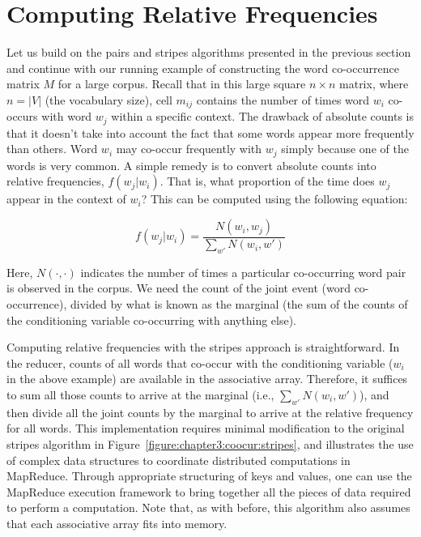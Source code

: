 \section{Computing Relative Frequencies}
\label{chapter3:cond-prob}

Let us build on the pairs and stripes algorithms presented in the
previous section and continue with our running example of constructing
the word co-occurrence matrix $M$ for a large corpus.  Recall that in
this large square $n \times n$ matrix, where $n=|V|$ (the vocabulary
size), cell $m_{ij}$ contains the number of times word $w_i$ co-occurs
with word $w_j$ within a specific context.  The drawback of absolute
counts is that it doesn't take into account the fact that some words
appear more frequently than others.  Word $w_i$ may co-occur
frequently with $w_j$ simply because one of the words is very common.
A simple remedy is to convert absolute counts into relative
frequencies, $f(w_j|w_i)$.  That is, what proportion of the time does
$w_j$ appear in the context of $w_i$?  This can be computed using the
following equation:

\begin{equation}
f(w_j|w_i) = \frac{N(w_i,w_j)}{\sum_{w'}{N(w_i,w')}}
\end{equation}

\noindent Here, $N(\cdot, \cdot)$ indicates the number of times a
particular co-occurring word pair is observed in the corpus.  We need
the count of the joint event (word co-occurrence), divided by what is
known as the marginal (the sum of the counts of the conditioning
variable co-occurring with anything else).

Computing relative frequencies with the stripes approach is
straightforward.  In the reducer, counts of all words that co-occur
with the conditioning variable ($w_i$ in the above example) are
available in the associative array.  Therefore, it suffices to sum all
those counts to arrive at the marginal (i.e., $\sum_{w'}{N(w_i,w')}$),
and then divide all the joint counts by the marginal to arrive at the
relative frequency for all words.  This implementation requires
minimal modification to the original stripes algorithm in
Figure~\ref{figure:chapter3:coocur:stripes}, and illustrates the use
of complex data structures to coordinate distributed computations in
MapReduce.  Through appropriate structuring of keys and values, one
can use the MapReduce execution framework to bring together all the
pieces of data required to perform a computation.  Note that, as with
before, this algorithm also assumes that each associative array fits
into memory.

